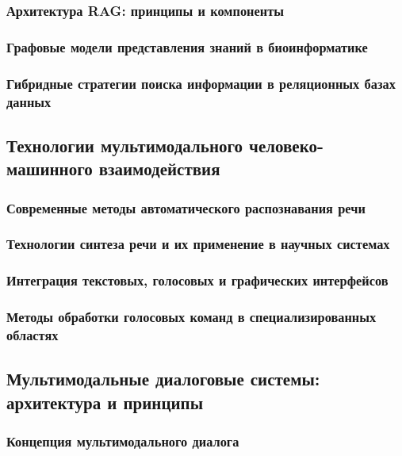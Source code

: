 \documentclass{syksu-coursework}
\begin{document}
\subsubsection{Архитектура RAG: принципы и компоненты}

\subsubsection{Графовые модели представления знаний в биоинформатике}

\subsubsection{Гибридные стратегии поиска информации в реляционных базах данных}

\subsection{Технологии мультимодального человеко-машинного взаимодействия}

\subsubsection{Современные методы автоматического распознавания речи}

\subsubsection{Технологии синтеза речи и их применение в научных системах}

\subsubsection{Интеграция текстовых, голосовых и графических интерфейсов}

\subsubsection{Методы обработки голосовых команд в специализированных областях}

\subsection{Мультимодальные диалоговые системы: архитектура и принципы}

\subsubsection{Концепция мультимодального диалога}
\end{document}
